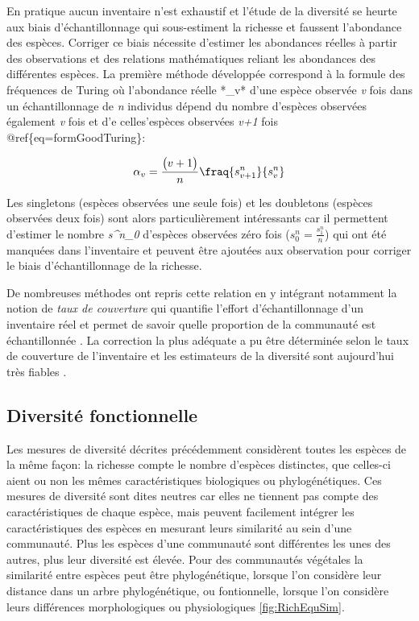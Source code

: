 \documentclass[
  11pt,
  french,
  A4paper,
  extrafontsizes,onecolumn,openright
  ]{memoir}
\begin{document}
En pratique aucun inventaire n'est exhaustif et l'étude de la diversité
se heurte aux biais d'échantillonnage qui sous-estiment la richesse et
faussent l'abondance des espèces. Corriger ce biais nécessite d'estimer
les abondances réelles à partir des observations et des relations
mathématiques reliant les abondances des différentes espèces. La
première méthode développée correspond à la formule des fréquences de
Turing \autocite{Good1953} où l'abondance réelle *\alpha\_v* d'une
espèce observée \emph{v} fois dans un échantillonnage de \emph{n}
individus dépend du nombre d'espèces observées également \emph{v} fois
et d'e celles'espèces observées \emph{v+1} fois
@ref\{eq=formGoodTuring\}:

\begin{equation}
\alpha_v=\frac{\big(v+1\big)}{n}\fraq{s^n_{v+1}}{s^n_v}
\label{eq:formGoodTuring}
\end{equation}

Les singletons (espèces observées une seule fois) et les doubletons
(espèces observées deux fois) sont alors particulièrement intéressants
car il permettent d'estimer le nombre \emph{s\^{}n\_0} d'espèces
observées zéro fois (\(s^n_0=\frac{s^n_1}{n}\)) qui ont été manquées
dans l'inventaire et peuvent être ajoutées aux observation pour corriger
le biais d'échantillonnage de la richesse.

De nombreuses méthodes ont repris cette relation en y intégrant
notamment la notion de \emph{taux de couverture} qui quantifie l'effort
d'échantillonnage d'un inventaire réel et permet de savoir quelle
proportion de la communauté est échantillonnée \autocite{Dauby2012}. La
correction la plus adéquate a pu être déterminée selon le taux de
couverture de l'inventaire et les estimateurs de la diversité sont
aujourd'hui très fiables \autocites{Chao2015}{Marcon2015b}.

\subsection{Diversité fonctionnelle}\label{diversite-fonctionnelle}

Les mesures de diversité décrites précédemment considèrent toutes les
espèces de la même façon: la richesse compte le nombre d'espèces
distinctes, que celles-ci aient ou non les mêmes caractéristiques
biologiques ou phylogénétiques. Ces mesures de diversité sont dites
neutres car elles ne tiennent pas compte des caractéristiques de chaque
espèce, mais peuvent facilement intégrer les caractéristiques des
espèces en mesurant leurs similarité au sein d'une communauté. Plus les
espèces d'une communauté sont différentes les unes des autres, plus leur
diversité est élevée. Pour des communautés végétales la similarité entre
espèces peut être phylogénétique, lorsque l'on considère leur distance
dans un arbre phylogénétique, ou fontionnelle, lorsque l'on considère
leurs différences morphologiques ou physiologiques \ref{fig:RichEquSim}.
\end{document}
